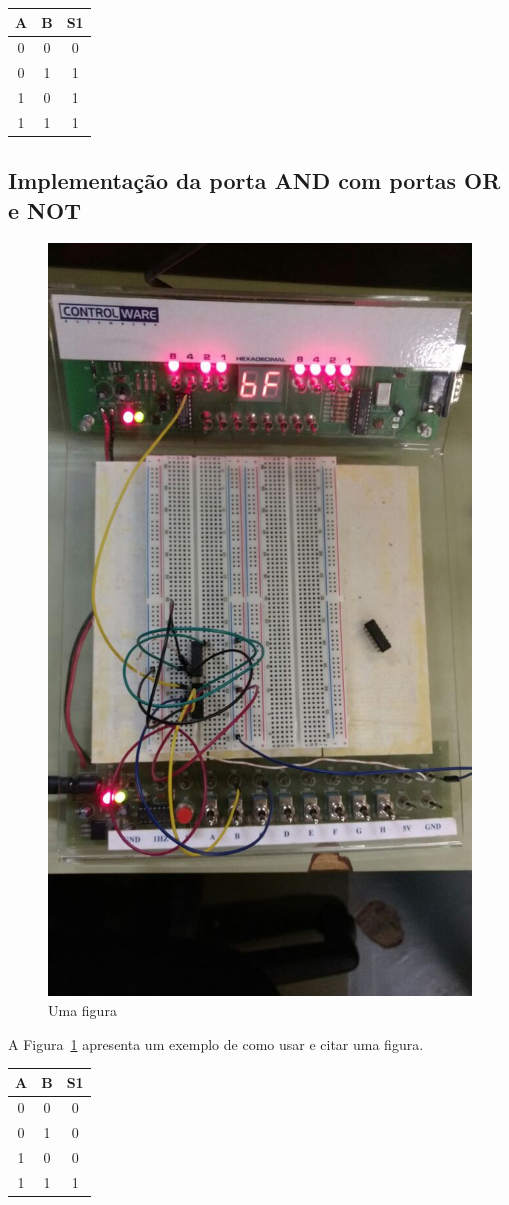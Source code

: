 \documentclass[12pt]{article}
\begin{document}
\begin{table}[H]
	\centering
	\begin{tabular}{|c|c|c|}
	\cline{1-3}
	\multicolumn{1}{|c|}{A} & \multicolumn{1}{|c|}{B} & \multicolumn{1}{|c|}{S1}\\
	\hline
	0 & 0 & 0 \\
	0 & 1 & 1 \\
	1 & 0 & 1 \\
	1 & 1 & 1 \\
	\hline
	\end{tabular}
	\label{ANDNOTOR}
\end{table}

\subsection{Implementação da porta AND com portas OR e NOT}
\label{sec:NOTOR}

\begin{figure}[H]
\centering
\includegraphics[width=.5\textwidth]{Porta_AND.jpeg}
\caption{Uma figura}
\label{fig:portaand}
\end{figure}

A Figura~\ref{fig:portaand} apresenta um exemplo de como usar e citar uma figura.

\begin{table}[H]
	\centering
	\begin{tabular}{|c|c|c|}
	\cline{1-3}
	\multicolumn{1}{|c|}{A} & \multicolumn{1}{|c|}{B} & \multicolumn{1}{|c|}{S1}\\
	\hline
	0 & 0 & 0\\
	0 & 1 & 0\\
	1 & 0 & 0\\
	1 & 1 & 1\\
	\hline
	\end{tabular}
	\label{ORNOTAND}
\end{table}
\end{document}
